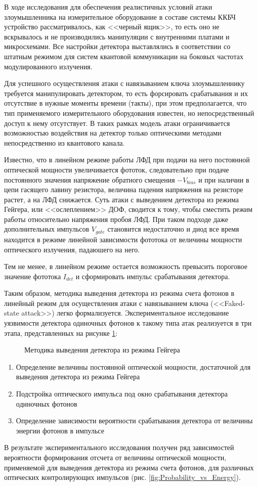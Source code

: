 В ходе исследования для обеспечения реалистичных условий атаки злоумышленника на измерительное оборудование в составе системы ККБЧ устройство рассматривалось, как <<черный ящик>>, то есть оно не вскрывалось и не производились манипуляции с внутренними платами и микросхемами. Все настройки детектора выставлялись в соответствии со штатным режимом для систем квантовой коммуникации на боковых частотах модулированного излучения. 

Для успешного осуществления атаки с навязыванием ключа злоумышленнику требуется манипулировать детектором, то есть форсировать срабатывания и их отсутствие в нужные моменты времени (такты), при этом предполагается, что тип применяемого измерительного оборудования известен, но непосредственный доступ к нему отсутствует. В таких рамках модель атаки ограничивается возможностью воздействия на детектор только оптическими методами непосредственно из квантового канала. 


Известно, что в линейном режиме работы ЛФД при подачи на него постоянной оптической мощности увеличивается фототок, следовательно при подаче постоянного значения напряжение обратного смещения $-V_{bias}$ и при наличии в цепи гасящего лавину резистора, величина падения напряжения на резисторе растет, а на ЛФД снижается. Суть атаки с выведением детектора из режима Гейгера, или <<ослеплением>> ДОФ, сводится к тому, чтобы сместить режим работы относительно напряжения пробоя ЛФД. При таком подходе даже дополнительных импульсов $V_{gate}$ становится недостаточно и диод все время находится в режиме линейной зависимости фототока от величины мощности оптического излучения, падаюшего на него.  

Тем не менее, в линейном режиме остается возможность превысить пороговое значение фототока $I_{det}$ и сформировать импульс срабатывания детектора.

Таким образом, методика выведения детектора из режима счета фотонов в линейный режим для осуществления атаки с навязыванием ключа (<<Faked-state attack>>) легко формализуется. Экспериментальное исследование уязвимости детектора одиночных фотонов к такому типа атак реализуется в три этапа, представленных на рисунке \ref{fig:Method_2.3}:
%
 \begin{figure}[ht] 
  \centering
  \caption{Методика выведения детектора из режима Гейгера}
  \label{fig:Method_2.3}
\end{figure}
%
 \begin{enumerate}
	\item Определение величины постоянной оптической мощности, достаточной для выведения детектора из режима Гейгера
	\item Подстройка оптического импульса под окно срабатывания детектора одиночных фотонов
	\item Определение зависимости вероятности срабатывания детектора от величины энергии фотонов в импульсе
\end{enumerate}
%
В результате экспериментального исследования получен ряд зависимостей вероятности формирования отсчета от величины оптической мощности, применяемой для выведения детектора из режима счета фотонов, для различных оптических контролирующих импульсов (рис. \ref{fig:Probability_vs_Energy}). 

